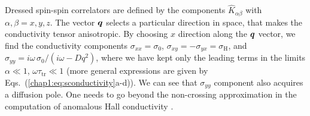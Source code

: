 


Dressed spin-spin correlators are defined by the components $ \hat{K}_{\alpha\beta}$ with $\alpha,\beta=x,y,z$.
The vector $\boldsymbol{q}$ selects a particular direction in space, that makes the conductivity tensor anisotropic. By choosing $x$ direction along the $\boldsymbol{q}$ vector, we find the conductivity components $\sigma_{xx} = \sigma_0$, $\sigma_{xy} = -\sigma_{yx}=\sigma_\textrm{H}$, and $\sigma_{yy}= i\omega \,\sigma_0/(i\omega-Dq^2)$, where we have kept only the leading terms in the limits $\alpha\ll 1$, $\omega\tau_\textrm{tr}\ll 1$ (more general expressions are given by Eqs.~(\ref{chap1:eq:sconductivity}a-d)). We can see that $\sigma_{yy}$ component also acquires a diffusion pole.  One needs to go beyond the non-crossing approximation in the computation of anomalous Hall conductivity  \cite{ivan,ivanPRL,ivanPRB}. 

